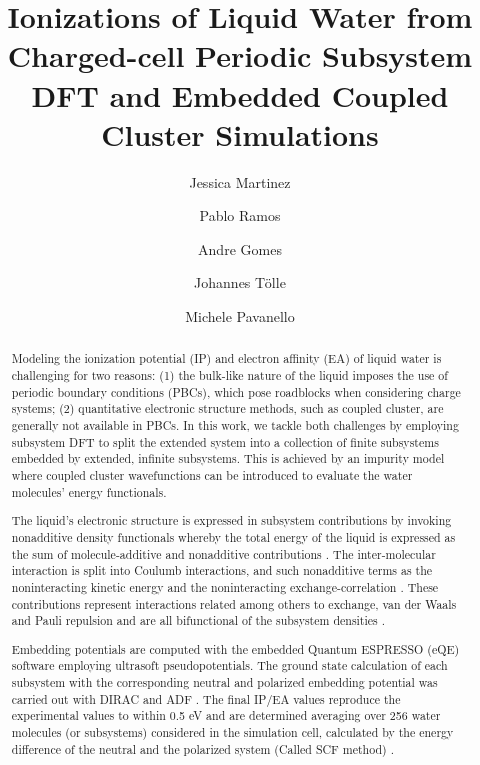 \documentclass[11pt,a4paper]{article}
\begin{document}
\title{Ionizations of Liquid Water from Charged-cell Periodic Subsystem DFT and Embedded Coupled Cluster Simulations}
\author[1]{Jessica Martinez}
\author[1]{Pablo Ramos}
\author[2]{Andre Gomes}
\author[3]{Johannes Tölle}
\author[1]{Michele Pavanello}
\date{}
\setcounter{Maxaffil}{0}
\renewcommand\Affilfont{\itshape\small}
\begin{titlepage}
  \maketitle
\end{titlepage}

\begin{abstract}
Modeling the ionization potential (IP) and electron affinity (EA) of liquid water is challenging for two reasons: (1) the bulk-like nature of the liquid imposes the use of periodic boundary conditions (PBCs), which pose roadblocks when considering charge systems; (2) quantitative electronic structure methods, such as coupled cluster, are generally not available in PBCs. In this work, we tackle both challenges by employing subsystem DFT to split the extended system into a collection of finite subsystems embedded by extended, infinite subsystems. This is achieved by an impurity model \cite{tolle2019charged} where coupled cluster wavefunctions can be introduced to evaluate the water molecules’ energy functionals. 

The liquid’s electronic structure is expressed in subsystem contributions by invoking nonadditive density functionals whereby the total energy of the liquid is expressed as the sum of molecule-additive and nonadditive contributions \cite{martyna1999reciprocal}. The inter-molecular interaction is split into Coulumb interactions, and such nonadditive terms as the noninteracting kinetic energy and the noninteracting exchange-correlation \cite{krishtal2015subsystem}. These contributions represent interactions related among others to exchange, van der Waals and Pauli repulsion and are all bifunctional of the subsystem densities \cite{tolle2019charged}. 

Embedding potentials are computed with the embedded Quantum ESPRESSO (eQE) \cite{genova2017eqe} software employing ultrasoft pseudopotentials. The ground state calculation of each subsystem with the corresponding neutral and polarized embedding potential was carried out with DIRAC \cite{saue2020dirac} and ADF \cite{te2001chemistry}. The final IP/EA values reproduce the experimental values to within 0.5 eV and are determined averaging over 256 water molecules (or subsystems) considered in the simulation cell, calculated by the energy difference of the neutral and the polarized system (Called SCF method) \cite{bagus1965self} \cite{waskom2017mwaskom}. 
\end{abstract}
\end{document}

